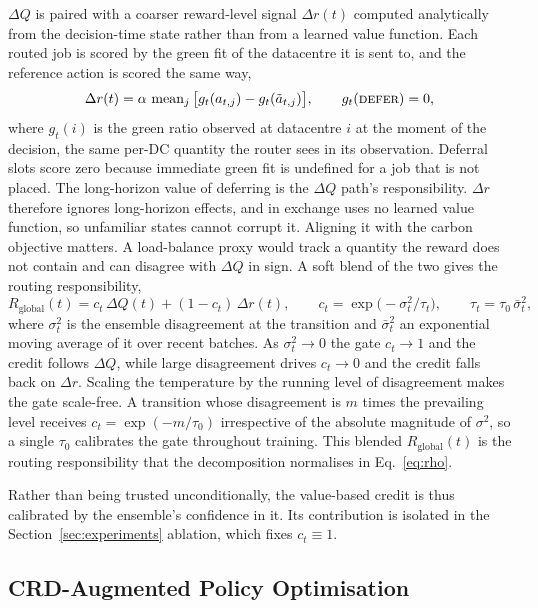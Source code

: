 \documentclass{article} %
\begin{document}
$\Delta Q$ is paired with a coarser reward-level signal $\Delta r(t)$ computed analytically from the decision-time state rather than from a learned value function. Each routed job is scored by the green fit of the datacentre it is sent to, and the reference action is scored the same way,
\begin{equation}
\Delta r(t)=\alpha\,\operatorname{mean}_{j}\big[g_t(a_{t,j})-g_t(\tilde{a}_{t,j})\big],
\qquad g_t(\textsc{defer})=0 ,
\label{eq:deltar}
\end{equation}
where $g_t(i)$ is the green ratio observed at datacentre $i$ at the moment of the decision, the same per-DC quantity the router sees in its observation. Deferral slots score zero because immediate green fit is undefined for a job that is not placed. The long-horizon value of deferring is the $\Delta Q$ path's responsibility. $\Delta r$ therefore ignores long-horizon effects, and in exchange uses no learned value function, so unfamiliar states cannot corrupt it. Aligning it with the carbon objective matters. A load-balance proxy would track a quantity the reward does not contain and can disagree with $\Delta Q$ in sign. A soft blend of the two gives the routing responsibility,
\begin{equation}
R_{\text{global}}(t)=c_t\,\Delta Q(t)+(1-c_t)\,\Delta r(t),
\qquad
c_t=\exp\!\big(-\sigma^2_t/\tau_t\big),
\qquad
\tau_t=\tau_0\,\bar{\sigma}^2_t ,
\label{eq:blend}
\end{equation}
where $\sigma^2_t$ is the ensemble disagreement at the transition and $\bar{\sigma}^2_t$ an exponential moving average of it over recent batches. As $\sigma^2_t\!\to\!0$ the gate $c_t\!\to\!1$ and the credit follows $\Delta Q$, while large disagreement drives $c_t\!\to\!0$ and the credit falls back on $\Delta r$. Scaling the temperature by the running level of disagreement makes the gate scale-free. A transition whose disagreement is $m$ times the prevailing level receives $c_t=\exp(-m/\tau_0)$ irrespective of the absolute magnitude of $\sigma^2$, so a single $\tau_0$ calibrates the gate throughout training. This blended $R_{\text{global}}(t)$ is the routing responsibility that the decomposition normalises in Eq.~\ref{eq:rho}.

Rather than being trusted unconditionally, the value-based credit is thus calibrated by the ensemble's confidence in it. Its contribution is isolated in the Section~\ref{sec:experiments} ablation, which fixes $c_t\equiv1$.



\subsection{CRD-Augmented Policy Optimisation}
\label{sec:crd-ppo}
\end{document}
